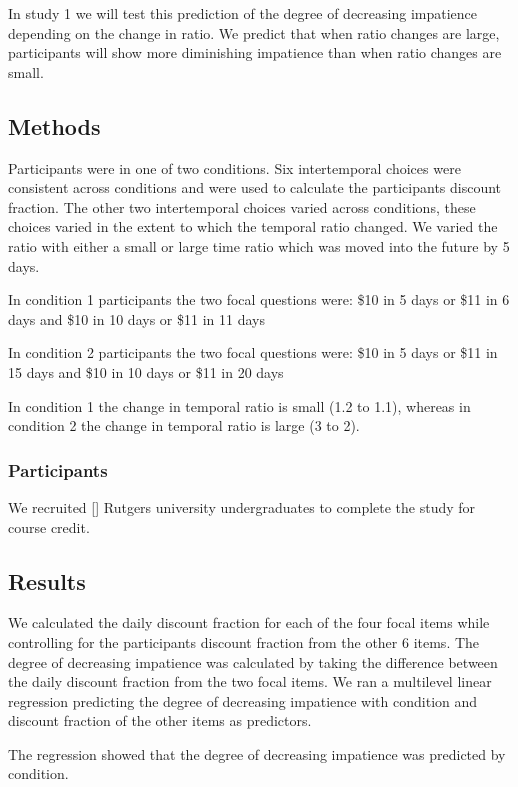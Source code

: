 \documentclass[]{article}
\begin{document}
In study 1 we will test this prediction of the degree of decreasing impatience depending on the change in ratio.
We predict that when ratio changes are large, participants will show more diminishing impatience than when ratio changes are small. 

\subsection{Methods}
Participants were in one of two conditions. 
Six intertemporal choices were consistent across conditions and were used to calculate the participants discount fraction.
The other two intertemporal choices varied across conditions, these choices varied in the extent to which the temporal ratio changed.
We varied the ratio with either a small or large time ratio which was moved into the future by 5 days. 

In condition 1 participants the two focal questions were:  
\$10 in 5 days or \$11 in 6 days
and 
\$10 in 10 days or \$11 in 11 days

In condition 2 participants the two focal questions were: 
\$10 in 5 days or \$11 in 15 days
and 
\$10 in 10 days or \$11 in 20 days

In condition 1 the change in temporal ratio is small (1.2 to 1.1), whereas in condition 2 the change in temporal ratio is large (3 to 2). 


\subsubsection{Participants}

We recruited [] Rutgers university undergraduates to complete the study for course credit. 

\subsection{Results}
 
We calculated the daily discount fraction for each of the four focal items while controlling for the participants discount fraction from the other 6 items. 
The degree of decreasing impatience was calculated by taking the difference between the daily discount fraction from the two focal items. 
We ran a multilevel linear regression predicting the degree of decreasing impatience with condition and discount fraction of the other items as predictors. 

The regression showed that the degree of decreasing impatience was predicted by condition.  
\end{document}
